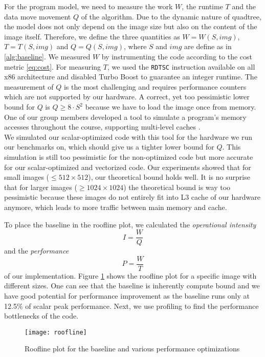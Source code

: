 For the program model, we need to measure the work $W$, the runtime $T$ and the data move movement $Q$ of
the algorithm. Due to the dynamic nature of quadtree, the model does not only depend on the image size 
but also on the content of the image itself. Therefore, we define the three 
quantities as $W=W(S, img)$, $T=T(S, img)$ and $Q=Q(S, img)$, where $S$ and $img$ are define as in 
\ref{alg:baseline}. We measured $W$ by instrumenting the code according to the cost metric \ref{eq:cost}.
For measuring $T$, we used the \texttt{RDTSC} instruction available on all x86 architecture and disabled
Turbo Boost to guarantee an integer runtime. The measurement of $Q$ is the most challenging and requires
performance counters which are not supported by our hardware. A correct, yet too pessimistic lower bound for $Q$
is $Q \geq 8 \cdot S^2$ because we have to load the image once from memory. One of our group members
developed a tool to simulate a program's memory accesses throughout the course, supporting multi-level caches \cite{github-cache}.\\
We simulated our scalar-optimized code with this tool for the hardware we run our benchmarks on, 
which should give us a tighter lower bound for $Q$. 
This simulation is still too pessimistic for the non-optimized code but more accurate for our scalar-optimized and vectorized code. 
Our experiments showed that for small images ($\leq 512 \times 512$), our theoretical bound holds well. 
It is no surprise that for larger images ($\geq 1024 \times 1024$) the theoretical bound is way too pessimistic
because these images do not entirely fit into L3 cache of our hardware anymore, which leads to more traffic between main memory and cache.

To place the baseline in the roofline plot, we calculated the \textit{operational intensity}
$$
I=\frac{W}{Q}
$$
and the \textit{performance}
$$P=\frac{W}{T}$$
of our implementation. Figure \ref{fig:roofline} shows the 
roofline plot for a specific image with different sizes. One can see that the baseline is inherently compute bound and we have good potential for
performance improvement as the baseline runs only at 12.5\% of scalar peak performance. Next, we use 
profiling to find the performance bottlenecks of the code.

\begin{figure}
  \texttt{[image: roofline]}
  \caption{Roofline plot for the baseline and various performance optimizations}
  \label{fig:roofline}
\end{figure}

